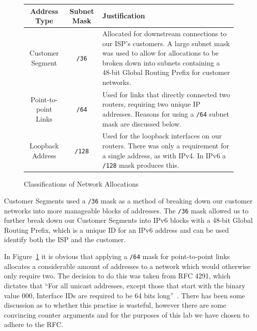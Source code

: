 \begin{figure}[!ht]
    \caption{Classifications of Network Allocations}
    \label{figure:network-alloc-3}
    \centering
    \begin{tabular}{|c|c|p{5.5cm}|}

        \hline \textbf{Address Type} & \textbf{Subnet Mask} & \textbf{Justification} \\

        \hline
        Customer Segment & \texttt{/36} & Allocated for downstream connections
        to our ISP's customers. A large subnet mask was used to allow for
        allocations to be broken down into subnets containing a 48-bit Global
        Routing Prefix for customer networks.\\

        \hline
        Point-to-point Links & \texttt{/64} & Used for links that directly
        connected two routers, requiring two unique IP addresses. Reasons for
        using a \texttt{/64} subnet mask are discussed below.\\
        \hline
        Loopback Address & \texttt{/128} & Used for the loopback interfaces on
        our routers. There was only a requirement for a single address, as with
        IPv4. In IPv6 a \texttt{/128} mask produces this.\\

        \hline
    \end{tabular}
\end{figure}

Customer Segments used a \texttt{/36} mask as a method of breaking down our
customer networks into more manageable blocks of addresses. The \texttt{/36}
mask allowed us to further break down our Customer Segments into IPv6 blocks
with a 48-bit Global Routing Prefix, which is a unique ID for an IPv6 address
and can be used identify both the ISP and the customer.

In Figure~\ref{figure:network-alloc-3} it is obvious that applying a
\texttt{/64} mask for point-to-point links allocates a considerable amount of
addresses to a network which would otherwise only require two. The decision to
do this was taken from RFC 4291, which dictates that ``For all unicast
addresses, except those that start with the binary value 000, Interface IDs are
required to be 64 bits long''~\cite{rfc4291}. There has been some discussion as
to whether this practise is wasteful\cite{ipv6waste}, however there are
some convincing counter arguments\cite{ipv6notwaste} and for the purposes of
this lab we have chosen to adhere to the RFC.
